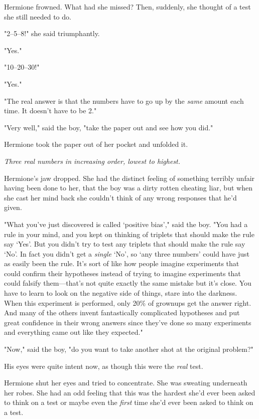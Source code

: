 Hermione frowned. What had she missed? Then, suddenly, she thought of a test
she still needed to do.

"2--5--8!" she said triumphantly.

"Yes."

"10--20--30!"

"Yes."

"The real answer is that the numbers have to go up by the \emph{same} amount
each time. It doesn't have to be 2."

"Very well," said the boy, "take the paper out and see how you did."

Hermione took the paper out of her pocket and unfolded it.

\emph{Three real numbers in increasing order, lowest to highest.}

Hermione's jaw dropped. She had the distinct feeling of something terribly
unfair having been done to her, that the boy was a dirty rotten cheating liar,
but when she cast her mind back she couldn't think of any wrong responses that
he'd given.

"What you've just discovered is called `positive bias'," said the boy. "You had
a rule in your mind, and you kept on thinking of triplets that should make the
rule say `Yes'. But you didn't try to test any triplets that should make the
rule say `No'. In fact you didn't get a \emph{single} `No', so `any three
numbers' could have just as easily been the rule. It's sort of like how people
imagine experiments that could confirm their hypotheses instead of trying to
imagine experiments that could falsify them—that's not quite exactly the same
mistake but it's close. You have to learn to look on the negative side of
things, stare into the darkness. When this experiment is performed, only 20\% of
grownups get the answer right. And many of the others invent fantastically
complicated hypotheses and put great confidence in their wrong answers since
they've done so many experiments and everything came out like they expected."

"Now," said the boy, "do you want to take another shot at the original problem?"

His eyes were quite intent now, as though this were the \emph{real} test.

Hermione shut her eyes and tried to concentrate. She was sweating underneath
her robes. She had an odd feeling that this was the hardest she'd ever been
asked to think on a test or maybe even the \emph{first} time she'd ever been
asked to think on a test.

